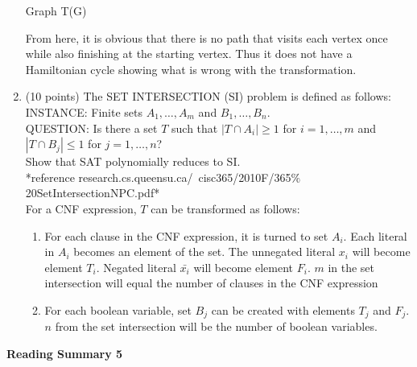 \documentclass[11pt]{article}
\begin{document}
\begin{enumerate}
\begin{center}
	  Graph T(G)
	\end{center}
	From here, it is obvious that there is no path that visits each vertex once while also finishing at the starting vertex. Thus
	it does not have a Hamiltonian cycle showing what is wrong with the transformation.
  \item (10 points) The SET INTERSECTION (SI) problem is defined as follows: \\
	INSTANCE: Finite sets $A_1,\ldots,A_m$ and $B_1,\ldots,B_n$. \\
	QUESTION: Is there a set $T$ such that $|T\cap A_i|\ge 1$ for $i=1,\ldots,m$ and $|T\cap B_j|\le 1$ for $j=1,\ldots,n$? \\
	Show that SAT polynomially reduces to SI. \\
	*reference research.cs.queensu.ca/~cisc365/2010F/365$\%$20SetIntersectionNPC.pdf* \\

	For a CNF expression, $T$ can be transformed as follows:
	\begin{enumerate}
	 \item For each clause in the CNF expression, it is turned to set $A_i$. Each literal in $A_i$ becomes an element of the set. The unnegated
	 literal $x_i$ will become element $T_i$. Negated literal $\bar{x_i}$ will become element $F_i$. $m$ in the set intersection will equal the
	 number of clauses in the CNF expression
	 \item For each boolean variable, set $B_j$ can be created with elements $T_j$ and $F_j$. $n$ from the set intersection will be the
	 number of boolean variables.
	\end{enumerate}
	
\end{enumerate}

\pagebreak
\setlength{\parindent}{1cm}
\centerline{\bf Reading Summary 5}
\end{document}
